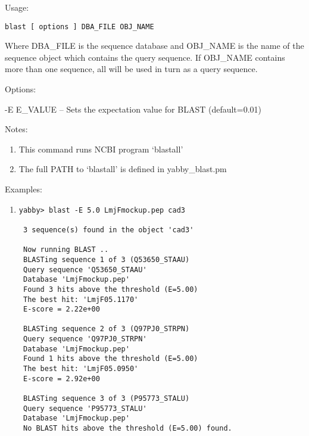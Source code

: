 \begin{description}


\item{Usage:}

{\tt blast [ options ] DBA\_FILE OBJ\_NAME}

 Where DBA\_FILE is the sequence database and OBJ\_NAME is the
 name of the sequence object which contains the query sequence.
 If OBJ\_NAME contains more than one sequence, all will be used
 in turn as a query sequence.


\item{Options:}
\begin{description}
\item -E E\_VALUE -- Sets the expectation value for BLAST (default=0.01)
\end{description}


\item{Notes:}
\begin{enumerate}
\item This command runs NCBI program `blastall'
\item The full PATH to `blastall' is defined in yabby\_blast.pm
\end{enumerate}


\item{Examples:}
\begin{enumerate}

\item
\begin{verbatim}
yabby> blast -E 5.0 LmjFmockup.pep cad3

 3 sequence(s) found in the object 'cad3'

 Now running BLAST ..
 BLASTing sequence 1 of 3 (Q53650_STAAU)
 Query sequence 'Q53650_STAAU'
 Database 'LmjFmockup.pep'
 Found 3 hits above the threshold (E=5.00)
 The best hit: 'LmjF05.1170'
 E-score = 2.22e+00

 BLASTing sequence 2 of 3 (Q97PJ0_STRPN)
 Query sequence 'Q97PJ0_STRPN'
 Database 'LmjFmockup.pep'
 Found 1 hits above the threshold (E=5.00)
 The best hit: 'LmjF05.0950'
 E-score = 2.92e+00

 BLASTing sequence 3 of 3 (P95773_STALU)
 Query sequence 'P95773_STALU'
 Database 'LmjFmockup.pep'
 No BLAST hits above the threshold (E=5.00) found.

\end{verbatim}


\end{enumerate}
\end{description}
